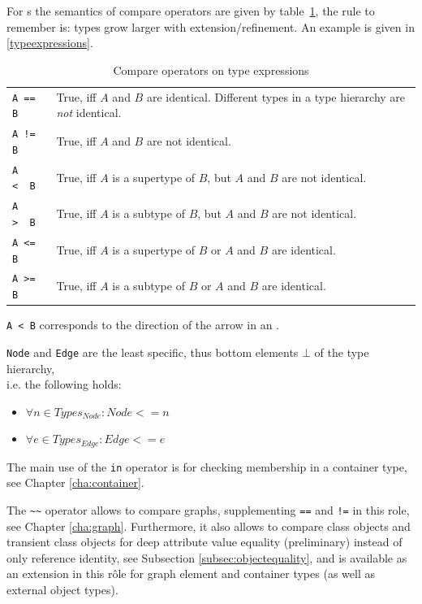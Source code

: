 For s the semantics of compare operators are given by table~\ref{compandtypes},
the rule to remember is: types grow larger with extension/refinement. An example is given in \ref{typeexpressions}.
\begin{table}[htbp]
  \centering
  \begin{tabularx}{\linewidth}{|l|X|} \hline
    \texttt{A == B} & True, iff $A$ and $B$ are identical. Different types in a type hierarchy are \emph{not} identical. \\
    \texttt{A != B} & True, iff $A$ and $B$ are not identical. \\
    \texttt{A <\ \ B} & True, iff $A$ is a supertype of $B$, but $A$ and $B$ are not identical. \\
    \texttt{A >\ \ B} & True, iff $A$ is a subtype of $B$, but $A$ and $B$ are not identical. \\
    \texttt{A <= B} & True, iff $A$ is a supertype of $B$ or $A$ and $B$ are identical. \\
    \texttt{A >= B} & True, iff $A$ is a subtype of $B$ or $A$ and $B$ are identical. \\ \hline
  \end{tabularx}
  \caption{Compare operators on type expressions}
  \label{compandtypes}
\end{table}
\begin{note}
  \texttt{A < B} corresponds to the direction of the arrow in an .
\end{note}
\begin{note}
  \texttt{Node} and \texttt{Edge} are the least specific, thus bottom elements $\bot$ of the type hierarchy,\\
  i.e. the following holds:
  \begin{itemize}
    \item $\forall n\in Types_{Node}: Node <= n$
    \item $\forall e\in Types_{Edge}: Edge <= e$
  \end{itemize}
\end{note}

The main use of the \texttt{in} operator is for checking membership in a container type, see Chapter \ref{cha:container}.

The \texttt{\textasciitilde\textasciitilde} operator allows to compare graphs, supplementing \texttt{==} and \texttt{!=} in this role, see Chapter \ref{cha:graph}.
Furthermore, it also allows to compare class objects and transient class objects for deep attribute value equality (preliminary) instead of only reference identity, see Subsection \ref{subsec:objectequality}, and is available as an extension in this rôle for graph element and container types (as well as external object types).

